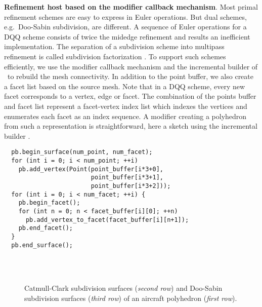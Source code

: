 \noindent\textbf{Refinement host based on the modifier callback mechanism}.
Most primal refinement schemes are easy to express in Euler
operations. But dual schemes, e.g.\ Doo-Sabin subdivision, are
different. A sequence of Euler operations for a DQQ scheme consists of
twice the midedge refinement \cite{Peters:1997:SSS} and results
an inefficient implementation. The separation of a
subdivision scheme into multipass refinement is
called subdivision factorization \cite{Joe:2003:FASS, Denis:2001:UFPDQ}. 
To support such schemes efficiently, we use
the modifier callback mechanism and the incremental builder of
\cgalpoly\ to rebuild the mesh connectivity. In addition to the point
buffer, we also create a facet list based on the source mesh. Note
that in a DQQ scheme, every new facet corresponds to a vertex, edge or
facet. The combination of the points buffer and facet list represent a
facet-vertex index list which indexes the vertices and enumerates each
facet as an index sequence. A modifier creating a polyhedron from such
a representation is straightforward, here a sketch using the
incremental builder .
\begin{lstlisting}
  pb.begin_surface(num_point, num_facet);
  for (int i = 0; i < num_point; ++i) 
    pb.add_vertex(Point(point_buffer[i*3+0], 
                        point_buffer[i*3+1], 
                        point_buffer[i*3+2]));        
  for (int i = 0; i < num_facet; ++i) {
    pb.begin_facet();
    for (int n = 0; n < facet_buffer[i][0]; ++n)
      pb.add_vertex_to_facet(facet_buffer[i][n+1]);
    pb.end_facet();
  }
  pb.end_surface();
\end{lstlisting}\vspace*{-3mm}

\begin{figure}
  \centering
   \\
  \\
  \caption{Catmull-Clark subdivision surfaces ({\itshape second row}) and
  Doo-Sabin subdivision surfaces ({\itshape third row}) 
  of an aircraft polyhedron ({\itshape first row}).
  }
  \label{fig:SubExample}\vspace*{-2mm}
\end{figure}


